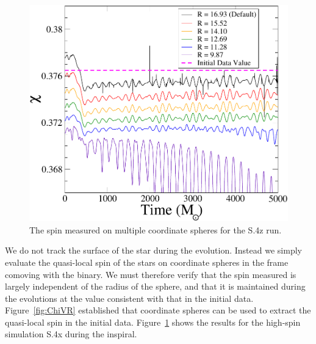 \documentclass[aps,prd,amsmath,floatfix
,twocolumn
,superscriptaddress,nofootinbib,showpacs]{revtex4-1}
\theoremstyle{plain} \newtheorem{thm}{Theorem} \newtheorem{lem}{Lemma}
\newcommand{\red}[1]{\textcolor{Red}{#1}}
\begin{document}
\begin{figure}
\includegraphics[width=0.95\columnwidth]{ChiVTZoomed}
\caption{{\label{fig:ChiVTZoomed}} The spin measured on multiple
  coordinate spheres for the S.4z run.}
\end{figure}

We do not track the surface of the star during the evolution.
Instead we simply evaluate the quasi-local spin of the stars on
coordinate spheres in the frame comoving with the binary.  We must
therefore verify that the spin measured is largely independent of the
radius of the sphere, and that it is maintained during the evolutions
at the value consistent with that in the initial data.
Figure~\ref{fig:ChiVR} established that coordinate spheres can be used
to extract the quasi-local spin in the initial data.
Figure~\ref{fig:ChiVTZoomed} shows the results for the high-spin
simulation S.4x during the inspiral.
\end{document}
